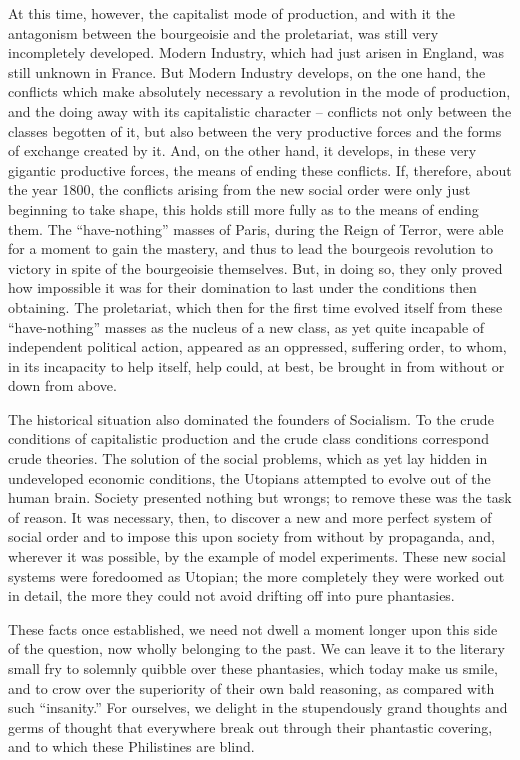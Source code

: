 At this time, however, the capitalist mode of production, and with it the
antagonism between the bourgeoisie and the proletariat, was still very
incompletely developed. Modern Industry, which had just arisen in England, was
still unknown in France. But Modern Industry develops, on the one hand, the
conflicts which make absolutely necessary a revolution in the mode of
production, and the doing away with its capitalistic character – conflicts not
only between the classes begotten of it, but also between the very productive
forces and the forms of exchange created by it. And, on the other hand, it
develops, in these very gigantic productive forces, the means of ending these
conflicts. If, therefore, about the year 1800, the conflicts arising from the
new social order were only just beginning to take shape, this holds still more
fully as to the means of ending them. The ``have-nothing'' masses of Paris,
during the Reign of Terror, were able for a moment to gain the mastery, and thus
to lead the bourgeois revolution to victory in spite of the bourgeoisie
themselves. But, in doing so, they only proved how impossible it was for their
domination to last under the conditions then obtaining. The proletariat, which
then for the first time evolved itself from these ``have-nothing'' masses as the
nucleus of a new class, as yet quite incapable of independent political action,
appeared as an oppressed, suffering order, to whom, in its incapacity to help
itself, help could, at best, be brought in from without or down from above.

The historical situation also dominated the founders of Socialism. To the crude
conditions of capitalistic production and the crude class conditions correspond
crude theories. The solution of the social problems, which as yet lay hidden in
undeveloped economic conditions, the Utopians attempted to evolve out of the
human brain. Society presented nothing but wrongs; to remove these was the task
of reason. It was necessary, then, to discover a new and more perfect system of
social order and to impose this upon society from without by propaganda, and,
wherever it was possible, by the example of model experiments. These new social
systems were foredoomed as Utopian; the more completely they were worked out in
detail, the more they could not avoid drifting off into pure phantasies.

These facts once established, we need not dwell a moment longer upon this side
of the question, now wholly belonging to the past. We can leave it to the
literary small fry to solemnly quibble over these phantasies, which today make
us smile, and to crow over the superiority of their own bald reasoning, as
compared with such ``insanity.'' For ourselves, we delight in the stupendously
grand thoughts and germs of thought that everywhere break out through their
phantastic covering, and to which these Philistines are blind.


